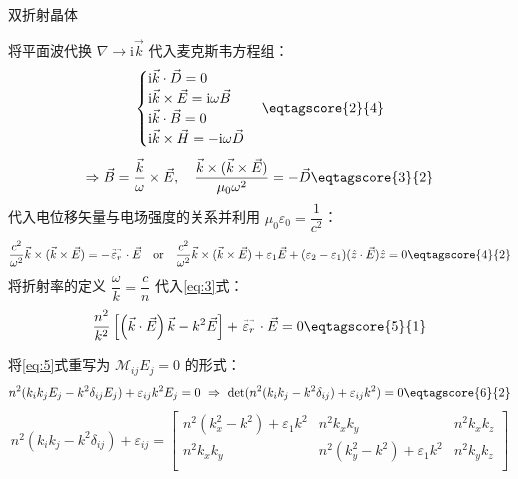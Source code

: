\documentclass[answer]{cphos}
\begin{document}
\begin{problem}[50]{双折射晶体}
\begin{solution}
 将平面波代换 $\nabla\rightarrow \mathrm{i}\vec k$ 代入麦克斯韦方程组：
\begin{equation}
    \begin{cases}
        \mathrm i\vec k\cdot\vec D=0\\
        \mathrm i\vec k\times\vec E=\mathrm i\omega\vec B\\
        \mathrm i\vec k\cdot\vec B=0\\
        \mathrm i\vec k\times\vec H=-\mathrm i\omega\vec D
    \end{cases}\eqtagscore{2}{4}\label{eq:2}
\end{equation}
\begin{equation}
    \Rightarrow\vec B=\dfrac{\vec k}{\omega}\times\vec E,\quad \dfrac{\vec k\times(\vec k\times\vec E)}{\mu_0\omega^2}=-\vec D\eqtagscore{3}{2}\label{eq:3}
\end{equation}
代入电位移矢量与电场强度的关系并利用 $\mu_0\varepsilon_0=\dfrac1{c^2}$：
\begin{equation}
    \dfrac{c^2}{\omega^2}\vec k\times(\vec k\times\vec E)=-{}\!\stackrel{\text{\fontsize{3}{1}$\rightarrow\rightarrow$}}{\varepsilon_r}\!{}\cdot\vec E\quad\text{or}\quad\dfrac{c^2}{\omega^2}\vec k\times(\vec k\times\vec E)+\varepsilon_1\vec E+(\varepsilon_2-\varepsilon_1)(\hat z\cdot\vec E)\hat z=0\eqtagscore{4}{2}
\end{equation}
 将折射率的定义 $\dfrac{\omega}{k}=\dfrac cn$ 代入\ref{eq:3}式：
\begin{equation}
    \dfrac{n^2}{k^2}\left[ \left( \vec k\cdot\vec E \right)\vec k-k^2\vec E \right]+{}\!\stackrel{\text{\fontsize{3}{1}$\rightarrow\rightarrow$}}{\varepsilon_r}\!{}\cdot\vec E=0\eqtagscore{5}{1}\label{eq:5}
\end{equation}
\begin{multisol}[解法]
    \item
将\ref{eq:5}式重写为 $\mathcal M_{ij}E_j=0$ 的形式：
\begin{equation}
    n^2(k_ik_jE_j-k^2\delta_{ij}E_j)+\varepsilon_{ij}k^2E_j=0\ \Rightarrow\ \det(n^2(k_ik_j-k^2\delta_{ij})+\varepsilon_{ij}k^2)=0\eqtagscore{6}{2}
\end{equation}
\begin{equation}
    n^2(k_ik_j-k^2\delta_{ij})+\varepsilon_{ij}=\begin{bmatrix}
        n^2(k_x^2-k^2)+\varepsilon_1k^2 & n^2k_xk_y & n^2k_xk_z \\
        n^2k_xk_y & n^2(k_y^2-k^2)+\varepsilon_1k^2 & n^2k_yk_z \\

\end{bmatrix}
\end{equation}
\end{multisol}
\end{solution}
\end{problem}
\end{document}
